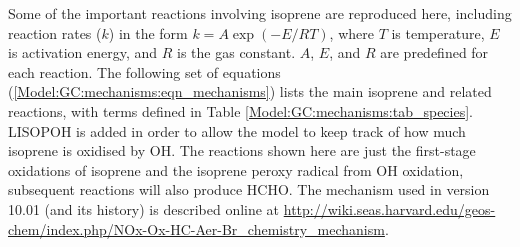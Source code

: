     Some of the important reactions involving isoprene are reproduced here, including reaction rates ($k$) in the form $ k = A \exp{(-E/RT)}$, where $T$ is temperature, $E$ is activation energy, and $R$ is the gas constant.
    $A$, $E$, and $R$ are predefined for each reaction.
    The following set of equations (\ref{Model:GC:mechanisms:eqn_mechanisms}) lists the main isoprene and related reactions, with terms defined in Table \ref{Model:GC:mechanisms:tab_species}.
    LISOPOH is added in order to allow the model to keep track of how much isoprene is oxidised by OH.
    The reactions shown here are just the first-stage oxidations of isoprene and the isoprene peroxy radical from OH oxidation, subsequent reactions will also produce HCHO.
    The mechanism used in version 10.01 (and its history) is described online at \url{http://wiki.seas.harvard.edu/geos-chem/index.php/NOx-Ox-HC-Aer-Br_chemistry_mechanism}.
    
    
